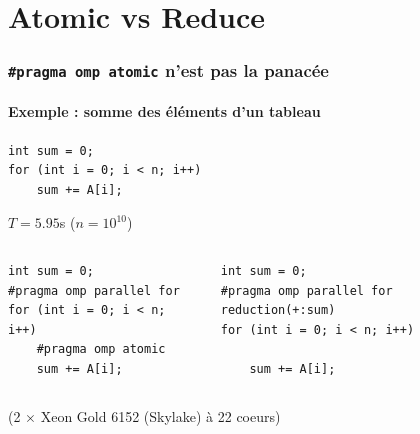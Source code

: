 \documentclass[xcolor={x11names,svgnames},x11names,svgnames]{beamer}
\begin{document}

\section{Atomic vs Reduce}


\begin{frame}[fragile]
  \frametitle{\texttt{\#pragma omp atomic} n'est pas la panacée}
  \framesubtitle{Exemple : somme des éléments d'un tableau}

\begin{verbatim}
int sum = 0;
for (int i = 0; i < n; i++)
    sum += A[i];
\end{verbatim}

      \bigskip
      
      \Large \alert{$T = 5.95$s} \qquad ($n = 10^{10}$)


      \vspace{1cm}
      
  \begin{columns}
    \begin{column}{0.4\textwidth}
\begin{verbatim}
int sum = 0;
#pragma omp parallel for
for (int i = 0; i < n; i++)
    #pragma omp atomic
    sum += A[i];
\end{verbatim}

      \bigskip
      
      
    \end{column}
    \begin{column}{0.6\textwidth}
\begin{verbatim}
int sum = 0;
#pragma omp parallel for reduction(+:sum)
for (int i = 0; i < n; i++)

    sum += A[i];
\end{verbatim}

      \bigskip
      
    \end{column}
  \end{columns}

\vspace{1cm}
  
\normalsize (2 $\times$ Xeon Gold 6152 (\og Skylake\fg{}) à 22 coeurs)
\end{frame}

\end{document}
